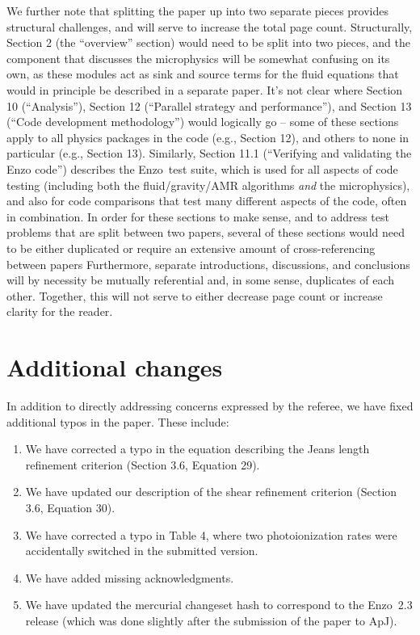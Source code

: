 \documentclass[11pt]{article}
\newcommand{\code}[1]{\textsf{#1}}
\newcommand{\enzo}{\code{Enzo}}
\begin{document}
We further note that splitting the paper up into two separate pieces
provides structural challenges, and will serve to increase the total
page count.  Structurally, Section 2 (the ``overview'' section) would
need to be split into two pieces, and the component that discusses the
microphysics will be somewhat confusing on its own, as these modules
act as sink and source terms for the fluid equations that would in
principle be described in a separate paper.  It's not clear where
Section 10 (``Analysis''), Section 12 (``Parallel strategy and
performance''), and Section 13 (``Code development methodology'')
would logically go -- some of these sections apply to all physics
packages in the code (e.g., Section 12), and others to none in
particular (e.g., Section 13).  Similarly, Section 11.1 (``Verifying
and validating the Enzo code'') describes the \enzo\ test suite, which
is used for all aspects of code testing (including both the
fluid/gravity/AMR algorithms \textit{and} the microphysics), and also
for code comparisons that test many different aspects of the code,
often in combination.  In order for these sections to make sense, and
to address test problems that are split between two papers, several of
these sections would need to be either duplicated or require an
extensive amount of cross-referencing between papers Furthermore,
separate introductions, discussions, and conclusions will by necessity
be mutually referential and, in some sense, duplicates of each other.
Together, this will not serve to either decrease page count or
increase clarity for the reader.

\section{Additional changes}

In addition to directly addressing concerns expressed by the referee,
we have fixed additional typos in the paper.  These include:

\begin{enumerate}
\item  We have corrected a typo in the equation describing the Jeans
  length refinement criterion (Section 3.6, Equation 29).

\item We have updated our description of the shear refinement
  criterion (Section 3.6, Equation 30).

\item We have corrected a typo in Table 4, where two photoionization
  rates were accidentally switched in the submitted version.

\item We have added missing acknowledgments.

\item We have updated the mercurial changeset hash to correspond to
  the \enzo\ 2.3 release (which was done slightly after the submission
  of the paper to ApJ).

\end{enumerate}



\newpage



\end{document}
